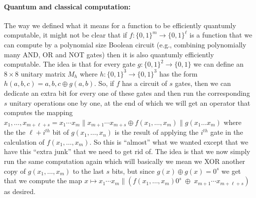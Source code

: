 \paragraph{Quantum and classical computation:} The way we defined what
it means for a function to be efficiently quantumly computable, it might
not be clear that if \(f:\{0,1\}^m\rightarrow\{0,1\}^\ell\) is a
function that we can compute by a polynomial size Boolean circuit (e.g.,
combining polynomially many AND, OR and NOT gates) then it is also
quantumly efficiently computable. The idea is that for every gate
\(g:\{0,1\}^2\rightarrow\{0,1\}\) we can define an \(8\times 8\) unitary
matrix \(M_h\) where \(h:\{0,1\}^3\rightarrow\{0,1\}^3\) has the form
\(h(a,b,c)=a,b,c\oplus g(a,b)\). So, if \(f\) has a circuit of \(s\)
gates, then we can dedicate an extra bit for every one of these gates
and then run the corresponding \(s\) unitary operations one by one, at
the end of which we will get an operator that computes the mapping
\(x_1,\ldots,x_{m+\ell+s} = x_1\cdots x_m \| x_{m+1}\cdots x_{m+s} \oplus f(x_1,\ldots,x_m)\|g(x_1\ldots x_m)\)
where the the \(\ell+i^{th}\) bit of \(g(x_1,\ldots,x_n)\) is the result
of applying the \(i^{th}\) gate in the calculation of
\(f(x_1,\ldots,x_m)\). So this is ``almost'' what we wanted except that
we have this ``extra junk'' that we need to get rid of. The idea is that
we now simply run the same computation again which will basically we
mean we XOR another copy of \(g(x_1,\ldots,x_m)\) to the last \(s\)
bits, but since \(g(x)\oplus g(x) = 0^s\) we get that we compute the map
\(x \mapsto x_1\cdots x_m \| (f(x_1,\ldots,x_m)0^s \;\oplus\; x_{m+1}\cdots x_{m+\ell+s})\)
as desired.


